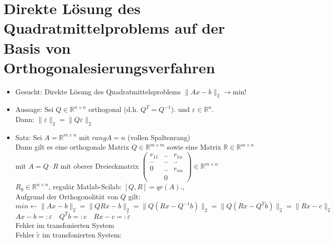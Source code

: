 \documentclass[ngerman]{tudscrreprt}
\begin{document}
\section{Direkte Lösung des Quadratmittelproblems auf der Basis von Orthogonalesierungsverfahren}
\begin{itemize}
\item Gesucht: Direkte Lösung des Quadratmittelsproblems $\| Ax - b \|_2 \rightarrow $min!
\item Aussage: Sei $Q \in \mathbb{R}^{n\times n}$ orthogonal (d.h. $Q^T = Q^{-1}$). und $\varepsilon \in \mathbb{R}^n$.\\

Dann: $\| \varepsilon \|_2 = \| Q \varepsilon \|_2 $\\

\item Satz: Sei $A=\mathbb{R}^{m\times n}$ mit $rangA=n$ (vollen Spaltenrang)\\
Dann gilt es eine orthogonale Matrix $Q\in \mathbb{R}^{m\times m}$ sowie eine Matrix $\mathbb{R} \in \mathbb{R}^{m\times n}$ mit $ A= Q\cdot R$ mit oberer Dreieckmatrix
$
\begin{pmatrix}
  r_{11} & .. & r_{1n} \\
  ..&  .. & .. \\
  0 &  .. & r_{nn} \\
   & 0 &
\end{pmatrix} 
\in \mathbb{R}^{m\times n}
$
\\
$R_0 \in \mathbb{R}^{n\times n}$, regulär Matlab-Scilab: $[Q,R] = qr(A). $,\\
Aufgrund der Orthogonolität von $Q$ gilt:\\
$min\leftarrow \|Ax-b\|_2 = \|QRx - b\|_2 = \|Q(Rx - Q^{-1} b)\|_2 = \|Q(Rx - Q^T b)\|_2 = \|Rx - c \|_2$
\\
$Ax-b =:\varepsilon \quad Q^Tb =:c \quad Rx-c =: \tilde{\varepsilon}$
\\ Fehler im transfonierten System\\

Fehler $\tilde{\varepsilon}$ im transfonierten System: \\


\end{itemize}
\end{document}
